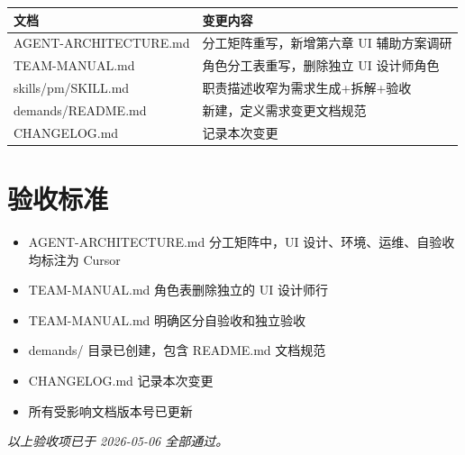 \documentclass[11pt,a4paper]{article}
\begin{document}
\begin{table}[h]
\centering
\begin{tabular}{lp{8cm}}
\toprule
\textbf{文档} & \textbf{变更内容} \\
\midrule
AGENT-ARCHITECTURE.md & 分工矩阵重写，新增第六章 UI 辅助方案调研 \\
TEAM-MANUAL.md & 角色分工表重写，删除独立 UI 设计师角色 \\
skills/pm/SKILL.md & 职责描述收窄为需求生成+拆解+验收 \\
demands/README.md & 新建，定义需求变更文档规范 \\
CHANGELOG.md & 记录本次变更 \\
\bottomrule
\end{tabular}
\end{table}

\section{验收标准}

\begin{itemize}
  \item[$\square$] AGENT-ARCHITECTURE.md 分工矩阵中，UI 设计、环境、运维、自验收均标注为 Cursor
  \item[$\square$] TEAM-MANUAL.md 角色表删除独立的 UI 设计师行
  \item[$\square$] TEAM-MANUAL.md 明确区分自验收和独立验收
  \item[$\square$] demands/ 目录已创建，包含 README.md 文档规范
  \item[$\square$] CHANGELOG.md 记录本次变更
  \item[$\square$] 所有受影响文档版本号已更新
\end{itemize}

\vspace{1em}
\textit{以上验收项已于 2026-05-06 全部通过。}
\end{document}
